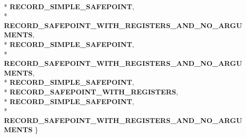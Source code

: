 \begin{DoxyCompactItemize}
\\*
{\bfseries R\+E\+C\+O\+R\+D\+\_\+\+S\+I\+M\+P\+L\+E\+\_\+\+S\+A\+F\+E\+P\+O\+I\+NT}, 
\\*
{\bfseries R\+E\+C\+O\+R\+D\+\_\+\+S\+A\+F\+E\+P\+O\+I\+N\+T\+\_\+\+W\+I\+T\+H\+\_\+\+R\+E\+G\+I\+S\+T\+E\+R\+S\+\_\+\+A\+N\+D\+\_\+\+N\+O\+\_\+\+A\+R\+G\+U\+M\+E\+N\+TS}, 
\\*
{\bfseries R\+E\+C\+O\+R\+D\+\_\+\+S\+I\+M\+P\+L\+E\+\_\+\+S\+A\+F\+E\+P\+O\+I\+NT}, 
\\*
{\bfseries R\+E\+C\+O\+R\+D\+\_\+\+S\+A\+F\+E\+P\+O\+I\+N\+T\+\_\+\+W\+I\+T\+H\+\_\+\+R\+E\+G\+I\+S\+T\+E\+R\+S\+\_\+\+A\+N\+D\+\_\+\+N\+O\+\_\+\+A\+R\+G\+U\+M\+E\+N\+TS}, 
\\*
{\bfseries R\+E\+C\+O\+R\+D\+\_\+\+S\+I\+M\+P\+L\+E\+\_\+\+S\+A\+F\+E\+P\+O\+I\+NT}, 
\\*
{\bfseries R\+E\+C\+O\+R\+D\+\_\+\+S\+A\+F\+E\+P\+O\+I\+N\+T\+\_\+\+W\+I\+T\+H\+\_\+\+R\+E\+G\+I\+S\+T\+E\+RS}, 
\\*
{\bfseries R\+E\+C\+O\+R\+D\+\_\+\+S\+I\+M\+P\+L\+E\+\_\+\+S\+A\+F\+E\+P\+O\+I\+NT}, 
\\*
{\bfseries R\+E\+C\+O\+R\+D\+\_\+\+S\+A\+F\+E\+P\+O\+I\+N\+T\+\_\+\+W\+I\+T\+H\+\_\+\+R\+E\+G\+I\+S\+T\+E\+R\+S\+\_\+\+A\+N\+D\+\_\+\+N\+O\+\_\+\+A\+R\+G\+U\+M\+E\+N\+TS}
 \}\hypertarget{classv8_1_1internal_1_1_l_code_gen_a166a08e2444941f7aec4c9748db666d0}{}\label{classv8_1_1internal_1_1_l_code_gen_a166a08e2444941f7aec4c9748db666d0}


\end{DoxyCompactItemize}
